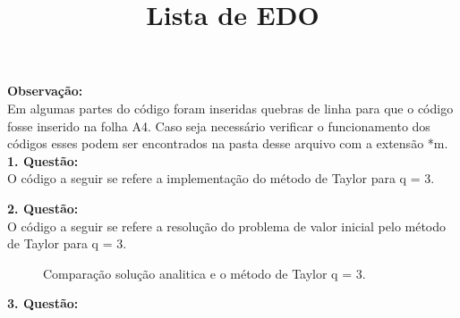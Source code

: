 \documentclass[a4paper,12pt]{article}
\title{Lista de EDO}
\date{\vspace{-5ex}}
\begin{document}
\maketitle\thispagestyle{fancy}
\textbf{Observa\c c\~ao:}\\
Em algumas partes do c\'odigo foram inseridas quebras de linha para que o c\'odigo fosse inserido na folha A4. Caso seja necess\'ario
verificar o funcionamento dos c\'odigos esses podem ser encontrados na pasta desse arquivo com a extens\~ao *m. \\

\textbf{1. Quest\~ao:}\\
O c\'odigo a seguir se refere a implementa\c c\~ao do m\'etodo de Taylor para q = 3.

\newpage

\textbf{2. Quest\~ao:}\\
O c\'odigo a seguir se refere a resolu\c c\~ao do problema de valor inicial pelo m\'etodo de Taylor para q =
3.

	\begin{figure}[!h]
		\centering
		\label{fig1} 
		\caption{Compara\c c\~ao solu\c c\~ao analitica e o m\'etodo de Taylor q = 3.}
	\end{figure}
\textbf{3. Quest\~ao:}\\
\end{document}
